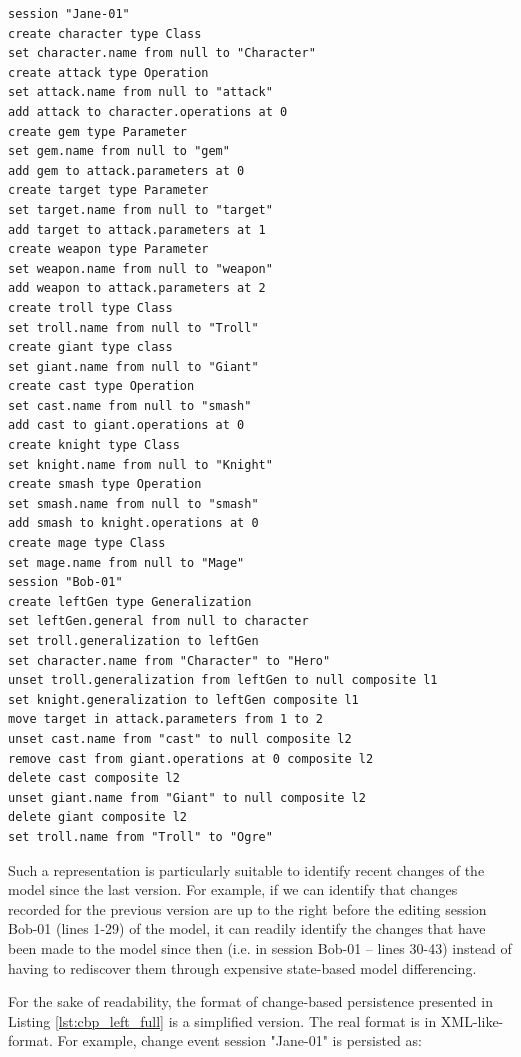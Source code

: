 \begin{lstlisting}[style=eol,escapechar=|,caption={The complete change events of Bob's model in Figure \ref{fig:class_diagram_left}.},label=lst:cbp_left_full]
session "Jane-01"
create character type Class
set character.name from null to "Character" 
create attack type Operation
set attack.name from null to "attack" 
add attack to character.operations at 0
create gem type Parameter
set gem.name from null to "gem" 
add gem to attack.parameters at 0
create target type Parameter
set target.name from null to "target" 
add target to attack.parameters at 1
create weapon type Parameter
set weapon.name from null to "weapon" 
add weapon to attack.parameters at 2
create troll type Class
set troll.name from null to "Troll" 
create giant type class
set giant.name from null to "Giant"
create cast type Operation
set cast.name from null to "smash"
add cast to giant.operations at 0
create knight type Class
set knight.name from null to "Knight"
create smash type Operation
set smash.name from null to "smash"
add smash to knight.operations at 0
create mage type Class
set mage.name from null to "Mage" 
session "Bob-01"
create leftGen type Generalization
set leftGen.general from null to character
set troll.generalization to leftGen
set character.name from "Character" to "Hero"
unset troll.generalization from leftGen to null composite l1
set knight.generalization to leftGen composite l1
move target in attack.parameters from 1 to 2
unset cast.name from "cast" to null composite l2
remove cast from giant.operations at 0 composite l2
delete cast composite l2
unset giant.name from "Giant" to null composite l2
delete giant composite l2
set troll.name from "Troll" to "Ogre"
\end{lstlisting}

Such a representation is particularly suitable to identify recent changes of the model since the last version. For example, if we can identify that changes recorded for the previous version are up to the right before the editing session \textsf{Bob-01} (lines 1-29) of the model, it can readily identify the changes that have been made to the model since then (i.e. in session \textsf{Bob-01} -- lines 30-43) instead of having to rediscover them through expensive state-based model differencing.

For the sake of readability, the format of change-based persistence presented in Listing \ref{lst:cbp_left_full} is a simplified version. The real format is in XML-like-format. For example, change event \textsf{session "Jane-01"} is persisted as:

